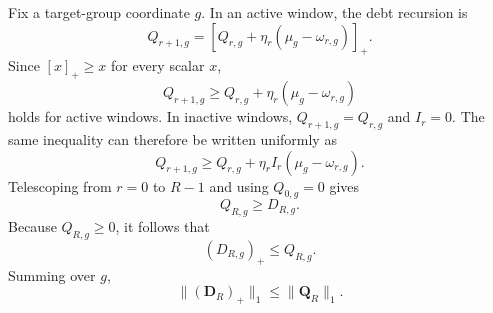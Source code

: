 Fix a target-group coordinate $g$.  In an active window, the debt recursion is
\begin{equation}
    Q_{r+1,g}
    =
    \left[
    Q_{r,g}
    +
    \eta_r
    \left(
    \mu_g-\omega_{r,g}
    \right)
    \right]_+.
    \label{eq:app_debt_coordinate}
\end{equation}
Since $[x]_+\ge x$ for every scalar $x$,
\begin{equation}
    Q_{r+1,g}
    \ge
    Q_{r,g}
    +
    \eta_r
    \left(
    \mu_g-\omega_{r,g}
    \right)
    \label{eq:app_debt_one_step}
\end{equation}
holds for active windows.  In inactive windows,
$Q_{r+1,g}=Q_{r,g}$ and $I_r=0$.  The same inequality can therefore be written
uniformly as
\begin{equation}
    Q_{r+1,g}
    \ge
    Q_{r,g}
    +
    \eta_rI_r
    \left(
    \mu_g-\omega_{r,g}
    \right).
    \label{eq:app_debt_one_step_all}
\end{equation}
Telescoping from $r=0$ to $R-1$ and using $Q_{0,g}=0$ gives
\begin{equation}
    Q_{R,g}
    \ge
    D_{R,g}.
    \label{eq:app_Q_dominates_D}
\end{equation}
Because $Q_{R,g}\ge0$, it follows that
\begin{equation}
    (D_{R,g})_+
    \le
    Q_{R,g}.
    \label{eq:app_positive_part_domination}
\end{equation}
Summing over $g$,
\begin{equation}
    \|(\mathbf{D}_R)_+\|_1
    \le
    \|\mathbf{Q}_R\|_1.
    \label{eq:app_positive_part_l1}
\end{equation}

